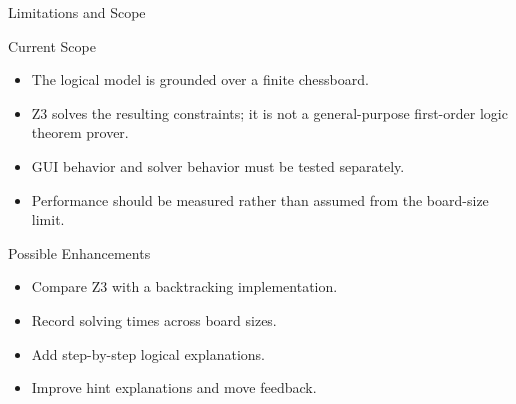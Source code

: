 \documentclass[aspectratio=169,12pt]{beamer}
\begin{document}
\begin{frame}{Limitations and Scope}

\begin{block}{Current Scope}

\begin{itemize}
    \item The logical model is grounded over a finite
          chessboard.
    \item Z3 solves the resulting constraints; it is not
          a general-purpose first-order logic theorem prover.
    \item GUI behavior and solver behavior must be tested
          separately.
    \item Performance should be measured rather than
          assumed from the board-size limit.
\end{itemize}

\end{block}

\begin{exampleblock}{Possible Enhancements}

\begin{itemize}
    \item Compare Z3 with a backtracking implementation.
    \item Record solving times across board sizes.
    \item Add step-by-step logical explanations.
    \item Improve hint explanations and move feedback.
\end{itemize}

\end{exampleblock}

\end{frame}

\end{document}
